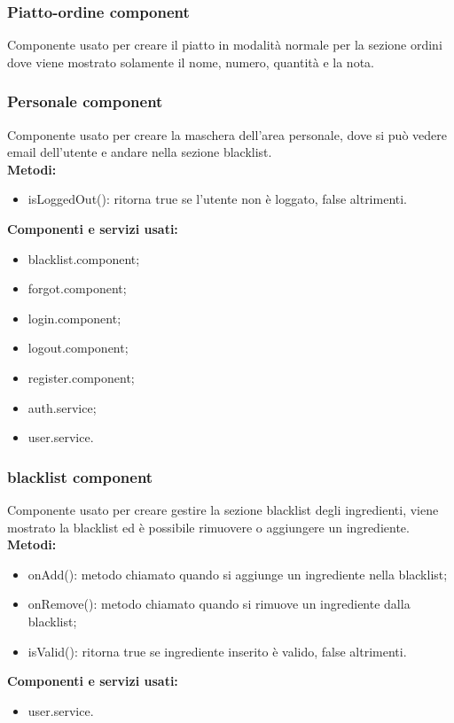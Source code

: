 \subsubsection{Piatto-ordine component}
Componente usato per creare il piatto in modalità normale per la sezione ordini dove viene mostrato solamente il nome, numero, quantità e la nota.\\

\subsubsection{Personale component}
Componente usato per creare la maschera dell'area personale, dove si può vedere email dell'utente e andare nella sezione blacklist.\\
\textbf{Metodi:}
\begin{itemize}
    \item isLoggedOut(): ritorna true se l'utente non è loggato, false altrimenti.
\end{itemize}
\textbf{Componenti e servizi usati:}
\begin{itemize}
    \item blacklist.component;
    \item forgot.component;
    \item login.component;
    \item logout.component;
    \item register.component;
    \item auth.service;
    \item user.service.
\end{itemize}

\subsubsection{blacklist component}
Componente usato per creare gestire la sezione blacklist degli ingredienti, viene mostrato la blacklist ed è possibile rimuovere o aggiungere un ingrediente.\\
\textbf{Metodi:}
\begin{itemize}
    \item onAdd(): metodo chiamato quando si aggiunge un ingrediente nella blacklist;
    \item onRemove(): metodo chiamato quando si rimuove un ingrediente dalla blacklist;
    \item isValid(): ritorna true se ingrediente inserito è valido, false altrimenti.
\end{itemize}
\textbf{Componenti e servizi usati:}
\begin{itemize}
    \item user.service.
\end{itemize}


